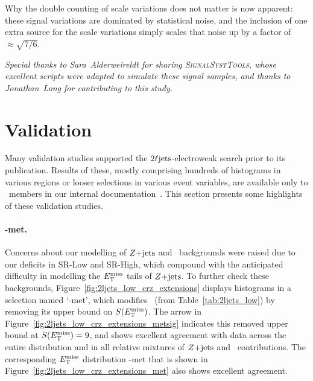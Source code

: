 Why the double counting of scale variations does not matter is now apparent:
these signal variations are dominated by statistical noise, and the inclusion
of one extra source for the scale variations simply scales that noise up by
a factor of $\approx \sqrt{7/6}$.

\emph{%
Special thanks to Sara~Alderweireldt for sharing \textsc{SignalSystTools},
whose excellent scripts were adapted to simulate these signal
samples, and thanks to Jonathan~Long for contributing to this study.
}

\section{Validation}
\label{sec:2ljets_validation}
Many validation studies supported the $2\ell\mathrm{jets}$-electroweak search prior to
its publication.
Results of these, mostly comprising hundreds of histograms in various regions
or looser selections in various event variables, are available only to \atlas\
members in our internal documentation~\cite{twoljets2018int}.
This section presents some highlights of these validation studies.

\paragraph{\crz-met.}
Concerns about our modelling of $Z\mathrm{+jets}$ and \diboson\ backgrounds were
raised due to our deficits in SR-Low and SR-High, which compound with the
anticipated difficulty in modelling the $E_\mathrm{T}^\mathrm{miss}$ tails of $Z\mathrm{+jets}$.
To further check these backgrounds, Figure~\ref{fig:2ljets_low_crz_extensions}
displays histograms in a selection named `\crz-met', which modifies \crz\
(from Table~\ref{tab:2ljets_low}) by removing its upper bound on $S(E_\mathrm{T}^\mathrm{miss})$.
The arrow in Figure~\ref{fig:2ljets_low_crz_extensions_metsig} indicates this
removed upper bound at $S(E_\mathrm{T}^\mathrm{miss}) = 9$, and shows excellent agreement with data
across the entire distribution and in all relative mixtures of $Z\mathrm{+jets}$ and
\diboson\ contributions.
The corresponding $E_\mathrm{T}^\mathrm{miss}$ distribution \crz-met that is shown in
Figure~\ref{fig:2ljets_low_crz_extensions_met}
also shows excellent agreement.

